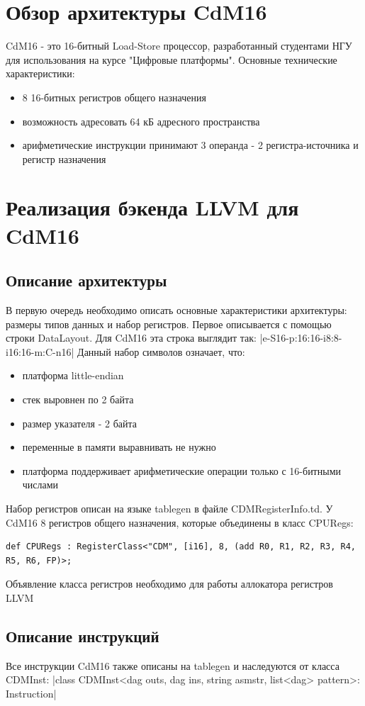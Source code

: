 \documentclass[a4paper,14pt]{extarticle}
\begin{document}
\pagebreak
\section{Обзор архитектуры CdM16}
CdM16 - это 16-битный Load-Store процессор, разработанный студентами НГУ для использования на курсе "Цифровые платформы"\cite{cdm:slides}. Основные технические характеристики:
\begin{itemize}
	\item 8 16-битных регистров общего назначения
	\item возможность адресовать 64 кБ адресного пространства
	\item арифметические инструкции принимают 3 операнда - 2 регистра-источника и регистр назначения
\end{itemize}

\pagebreak
\section{Реализация бэкенда LLVM для CdM16}
\subsection{Описание архитектуры}
В первую очередь необходимо описать основные характеристики архитектуры: размеры типов данных и набор регистров. Первое описывается с помощью строки DataLayout. Для CdM16 эта строка выглядит так: |e-S16-p:16:16-i8:8-i16:16-m:C-n16|
Данный набор символов означает, что:
\begin{itemize}
	\item платформа little-endian
	\item стек выровнен по 2 байта
	\item размер указателя - 2 байта
	\item переменные в памяти выравнивать не нужно
	\item платформа поддерживает арифметические операции только с 16-битными числами
\end{itemize}

Набор регистров описан на языке tablegen в файле CDMRegisterInfo.td. У CdM16 8 регистров общего назначения, которые объединены в класс CPURegs:
\begin{verbatim}
def CPURegs : RegisterClass<"CDM", [i16], 8, (add R0, R1, R2, R3, R4, R5, R6, FP)>;
\end{verbatim}
Объявление класса регистров необходимо для работы аллокатора регистров LLVM

\subsection{Описание инструкций}
Все инструкции CdM16 также описаны на tablegen и наследуются от класса CDMInst:
|class CDMInst<dag outs, dag ins, string asmstr, list<dag> pattern>: Instruction|
\end{document}
